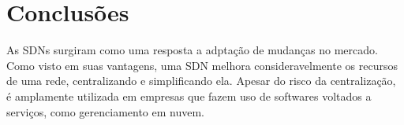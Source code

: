 \chapter{Conclusões}
\label{cap:conclusoes}

As SDNs surgiram como uma resposta a adptação de mudanças no mercado. Como visto em suas vantagens, uma
SDN melhora consideravelmente os recursos de uma rede, centralizando e simplificando ela. Apesar do risco
da centralização, é amplamente utilizada em empresas que fazem uso de softwares voltados a serviços, como
gerenciamento em nuvem.
